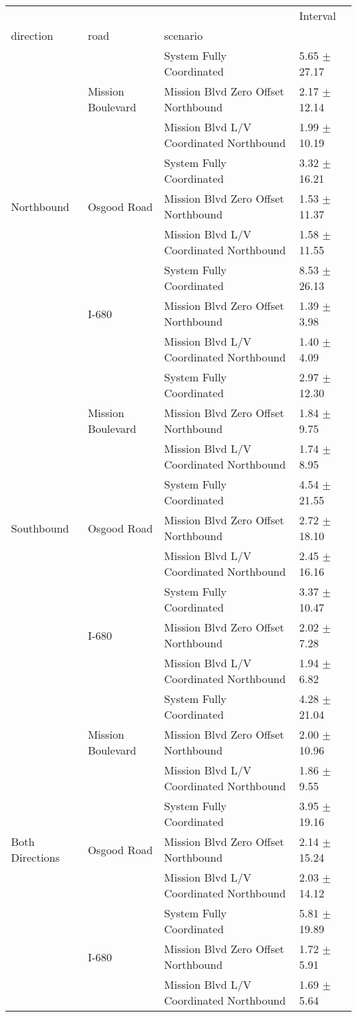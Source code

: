 \begin{tabular}{llll}
\toprule
 &  &  & Interval \\
direction & road & scenario &  \\
\midrule
\multirow[t]{9}{*}{Northbound} & \multirow[t]{3}{*}{Mission Boulevard} & System Fully Coordinated & 5.65 $\pm$ 27.17 \\
 &  & Mission Blvd Zero Offset Northbound & 2.17 $\pm$ 12.14 \\
 &  & Mission Blvd L/V Coordinated Northbound & 1.99 $\pm$ 10.19 \\
 & \multirow[t]{3}{*}{Osgood Road} & System Fully Coordinated & 3.32 $\pm$ 16.21 \\
 &  & Mission Blvd Zero Offset Northbound & 1.53 $\pm$ 11.37 \\
 &  & Mission Blvd L/V Coordinated Northbound & 1.58 $\pm$ 11.55 \\
 & \multirow[t]{3}{*}{I-680} & System Fully Coordinated & 8.53 $\pm$ 26.13 \\
 &  & Mission Blvd Zero Offset Northbound & 1.39 $\pm$ 3.98 \\
 &  & Mission Blvd L/V Coordinated Northbound & 1.40 $\pm$ 4.09 \\
\multirow[t]{9}{*}{Southbound} & \multirow[t]{3}{*}{Mission Boulevard} & System Fully Coordinated & 2.97 $\pm$ 12.30 \\
 &  & Mission Blvd Zero Offset Northbound & 1.84 $\pm$ 9.75 \\
 &  & Mission Blvd L/V Coordinated Northbound & 1.74 $\pm$ 8.95 \\
 & \multirow[t]{3}{*}{Osgood Road} & System Fully Coordinated & 4.54 $\pm$ 21.55 \\
 &  & Mission Blvd Zero Offset Northbound & 2.72 $\pm$ 18.10 \\
 &  & Mission Blvd L/V Coordinated Northbound & 2.45 $\pm$ 16.16 \\
 & \multirow[t]{3}{*}{I-680} & System Fully Coordinated & 3.37 $\pm$ 10.47 \\
 &  & Mission Blvd Zero Offset Northbound & 2.02 $\pm$ 7.28 \\
 &  & Mission Blvd L/V Coordinated Northbound & 1.94 $\pm$ 6.82 \\
\multirow[t]{9}{*}{Both Directions} & \multirow[t]{3}{*}{Mission Boulevard} & System Fully Coordinated & 4.28 $\pm$ 21.04 \\
 &  & Mission Blvd Zero Offset Northbound & 2.00 $\pm$ 10.96 \\
 &  & Mission Blvd L/V Coordinated Northbound & 1.86 $\pm$ 9.55 \\
 & \multirow[t]{3}{*}{Osgood Road} & System Fully Coordinated & 3.95 $\pm$ 19.16 \\
 &  & Mission Blvd Zero Offset Northbound & 2.14 $\pm$ 15.24 \\
 &  & Mission Blvd L/V Coordinated Northbound & 2.03 $\pm$ 14.12 \\
 & \multirow[t]{3}{*}{I-680} & System Fully Coordinated & 5.81 $\pm$ 19.89 \\
 &  & Mission Blvd Zero Offset Northbound & 1.72 $\pm$ 5.91 \\
 &  & Mission Blvd L/V Coordinated Northbound & 1.69 $\pm$ 5.64 \\
\bottomrule
\end{tabular}
